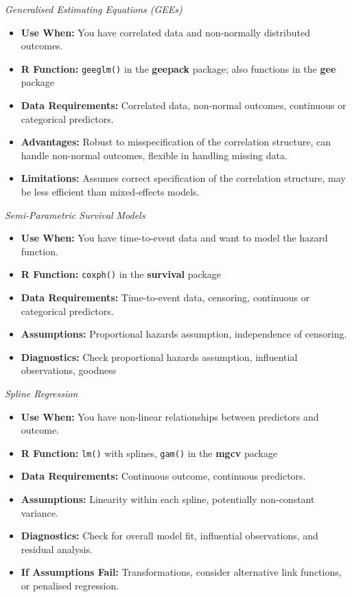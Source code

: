 \documentclass[
  letterpaper,
]{book}
\providecommand{\tightlist}{%
  \setlength{\itemsep}{0pt}\setlength{\parskip}{0pt}}\usepackage{longtable,booktabs,array}
\begin{document}
\emph{Generalised Estimating Equations (GEEs)}

\begin{itemize}
\tightlist
\item
  \textbf{Use When:} You have correlated data and non-normally
  distributed outcomes.
\item
  \textbf{R Function:} \texttt{geeglm()} in the \textbf{geepack}
  package; also functions in the \textbf{gee} package
\item
  \textbf{Data Requirements:} Correlated data, non-normal outcomes,
  continuous or categorical predictors.
\item
  \textbf{Advantages:} Robust to misspecification of the correlation
  structure, can handle non-normal outcomes, flexible in handling
  missing data.
\item
  \textbf{Limitations:} Assumes correct specification of the correlation
  structure, may be less efficient than mixed-effects models.
\end{itemize}

\emph{Semi-Parametric Survival Models}

\begin{itemize}
\tightlist
\item
  \textbf{Use When:} You have time-to-event data and want to model the
  hazard function.
\item
  \textbf{R Function:} \texttt{coxph()} in the \textbf{survival} package
\item
  \textbf{Data Requirements:} Time-to-event data, censoring, continuous
  or categorical predictors.
\item
  \textbf{Assumptions:} Proportional hazards assumption, independence of
  censoring.
\item
  \textbf{Diagnostics:} Check proportional hazards assumption,
  influential observations, goodness
\end{itemize}

\emph{Spline Regression}

\begin{itemize}
\tightlist
\item
  \textbf{Use When:} You have non-linear relationships between
  predictors and outcome.
\item
  \textbf{R Function:} \texttt{lm()} with splines, \texttt{gam()} in the
  \textbf{mgcv} package
\item
  \textbf{Data Requirements:} Continuous outcome, continuous predictors.
\item
  \textbf{Assumptions:} Linearity within each spline, potentially
  non-constant variance.
\item
  \textbf{Diagnostics:} Check for overall model fit, influential
  observations, and residual analysis.
\item
  \textbf{If Assumptions Fail:} Transformations, consider alternative
  link functions, or penalised regression.
\end{itemize}
\end{document}
